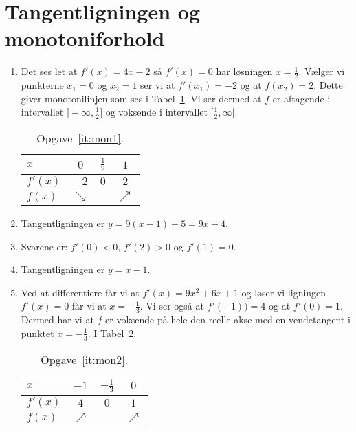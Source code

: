 \section{Tangentligningen og monotoniforhold}
\begin{enumerate}
	
	\item\label{it:mon1} Det ses let at $f'(x)=4x-2$ så $f'(x)=0$ har løsningen $x=\frac{1}{2}$. Vælger vi punkterne $x_1=0$ og $x_2=1$ ser vi at $f'(x_1)=-2$ og at $f(x_2)=2$. Dette giver monotonilinjen som ses i Tabel~\ref{fig:mon1}. Vi ser dermed at $f$ er aftagende i intervallet $ ]-\infty,\frac{1}{2}] $ og voksende i intervallet $[\frac{1}{2},\infty[$.
	
	\begin{table}[h!]
		\centering
		\begin{tabular}{@{}l  c c c@{}}
			$x$      & $0$ 		 & $\frac{1}{2}$	& $1$			\\ \toprule
			$f'(x)$  & $-2$		 &     $0$ 		 	& $2$			\\ \midrule
			$f(x)$   & $\searrow$&					& $\nearrow$	\\ \bottomrule  
		\end{tabular}
		\caption{Opgave~\ref{it:mon1}.}
		\label{fig:mon1}
	\end{table}
	
	
	\item Tangentligningen er $y=9(x-1)+5=9x-4$.
	
	\item Svarene er: $f'(0)<0$, $f'(2)>0$ og $f'(1)=0$.
	
	
	\item Tangentligningen er $y=x-1$.
	
	\item \label{it:mon2} Ved at differentiere får vi at $f'(x) = 9x^2+6x+1$ og løser vi ligningen $f'(x)=0$ får vi at $x=-\frac{1}{3}$. Vi ser også at $f'(-1))=4$ og at $f'(0)=1$. Dermed har vi at $f$ er voksende på hele den reelle akse med en vendetangent i punktet $x=-\frac{1}{3}$. I Tabel~\ref{fig:mon2}.
	\begin{table}[h!]
	\centering
	\begin{tabular}{@{}l  c c c@{}}
		$x$      & $-1$ 	 & $-\frac{1}{3}$	& $0$			\\ \toprule
		$f'(x)$  & $4$		 &     $0$ 		 	& $1$			\\ \midrule
		$f(x)$   & $\nearrow$&					& $\nearrow$	\\ \bottomrule  
	\end{tabular}
	\caption{Opgave~\ref{it:mon2}.}
	\label{fig:mon2}
\end{table}



\end{enumerate}
